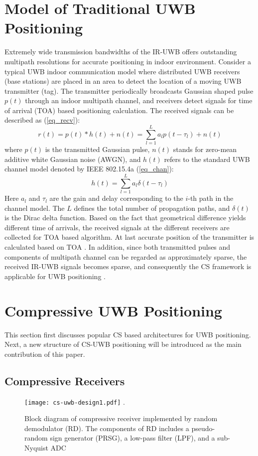 \section{Model of Traditional UWB Positioning}
\indent \indent Extremely wide transmission bandwidths of the IR-UWB offers outstanding multipath resolutions for accurate positioning in indoor environment. Consider a typical UWB indoor communication model where distributed UWB receivers (base stations) are placed in an area to detect the location of a moving UWB transmitter (tag). The transmitter periodically broadcasts Gaussian shaped pulse $p(t)$ through an indoor multipath channel, and receivers detect signals for time of arrival (TOA) based positioning calculation. The received signals can be described as (\ref{eq_recv}):
\begin{equation}
\label{eq_recv}
r(t) = p(t) * h(t) + n(t) = \sum_{l=1}^{L} a_l p(t-\tau_l) + n(t) 
\end{equation}
where $p(t)$ is the transmitted Gaussian pulse, $n(t)$ stands for zero-mean additive white Gaussian noise (AWGN), and $h(t)$ refers to the standard UWB channel model denoted by IEEE 802.15.4a (\ref{eq_chan}):
\begin{equation}
\label{eq_chan}
h(t) = \sum_{l=1}^{L} a_l \delta(t-\tau_l)
\end{equation}
Here $a_l$ and $\tau_l$ are the gain and delay corresponding to the $i$-th path in the channel model. The $L$ defines the total number of propagation paths, and $\delta(t)$ is the Dirac delta function. Based on the fact that geometrical difference yields different time of arrivals, the received signals at the different receivers are collected for TOA based algorithm. At last accurate position of the transmitter is calculated based on TOA \cite{d2010toa}. In addition, since both transmitted pulses and components of multipath channel can be regarded as approximately sparse, the received IR-UWB signals becomes sparse, and consequently the CS framework is applicable for UWB positioning \cite{yang2011compressive}. 

\section{Compressive UWB Positioning}
\indent \indent This section first discusses popular CS based architectures for UWB positioning. Next, a new structure of CS-UWB positioning will be introduced as the main contribution of this paper.    

\subsection{Compressive Receivers}
\begin{figure}[!t]
\centering
\texttt{[image: cs-uwb-design1.pdf]}
\DeclareGraphicsExtensions.
\caption{Block diagram of compressive receiver implemented by random demodulator (RD). The components of RD includes a pseudo-random sign generator (PRSG), a low-pass filter (LPF), and a sub-Nyquist ADC}
\label{cs-uwb-design1}
\end{figure}

